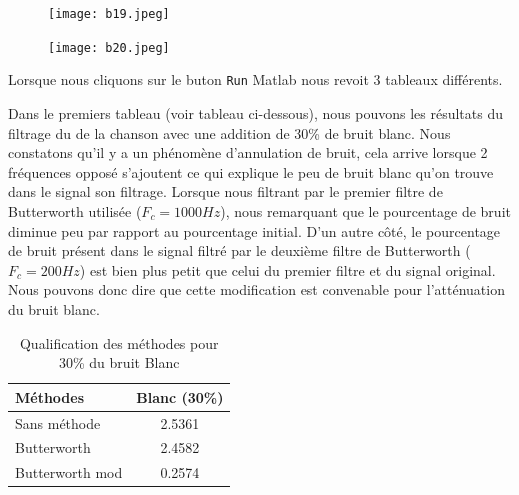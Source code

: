 \documentclass[conference,onecolumn]{IEEEtran}
\begin{document}
 \begin{figure}[H]
 \centering
    \texttt{[image: b19.jpeg]}
\end{figure}


 \begin{figure}[H]
 \centering
    \texttt{[image: b20.jpeg]}
\end{figure}


Lorsque nous cliquons sur le buton \texttt{Run} Matlab nous revoit 3 tableaux différents. 

Dans le premiers tableau (voir tableau ci-dessous), nous pouvons les résultats du filtrage du de la chanson avec une addition de 30\% de bruit blanc. Nous constatons qu'il y a un phénomène d'annulation de bruit, cela arrive lorsque 2 fréquences opposé s'ajoutent ce qui explique le peu de bruit blanc qu'on trouve dans le signal son filtrage. Lorsque nous filtrant par le premier filtre de Butterworth utilisée ($F_c = 1000 Hz$), nous remarquant que le pourcentage de bruit diminue peu par rapport au pourcentage initial. D'un autre côté, le pourcentage de bruit présent dans le signal filtré par le deuxième filtre de Butterworth ($F_c = 200 Hz$) est bien plus petit que celui du premier filtre et du signal original. Nous pouvons donc dire que cette modification est convenable pour l'atténuation du bruit blanc.

\begin{table}[hbt!]
    \centering
    \begin{tabular}{ l  c }
    \textbf{Méthodes} & \textbf{Blanc (30\%)} \\
    \hline
    Sans méthode &  2.5361\\
    Butterworth &  2.4582\\
    Butterworth mod &  0.2574\\
    \end{tabular}
    \caption{Qualification des méthodes pour 30\% du bruit Blanc}
    \label{table:t7}
\end{table}
\end{document}
